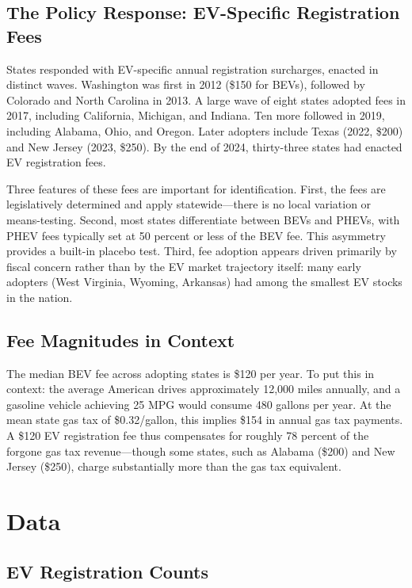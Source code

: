 \documentclass[12pt]{article}
\begin{document}
\subsection{The Policy Response: EV-Specific Registration Fees}

States responded with EV-specific annual registration surcharges, enacted in distinct waves. Washington was first in 2012 (\$150 for BEVs), followed by Colorado and North Carolina in 2013. A large wave of eight states adopted fees in 2017, including California, Michigan, and Indiana. Ten more followed in 2019, including Alabama, Ohio, and Oregon. Later adopters include Texas (2022, \$200) and New Jersey (2023, \$250). By the end of 2024, thirty-three states had enacted EV registration fees.

Three features of these fees are important for identification. First, the fees are legislatively determined and apply statewide---there is no local variation or means-testing. Second, most states differentiate between BEVs and PHEVs, with PHEV fees typically set at 50 percent or less of the BEV fee. This asymmetry provides a built-in placebo test. Third, fee adoption appears driven primarily by fiscal concern rather than by the EV market trajectory itself: many early adopters (West Virginia, Wyoming, Arkansas) had among the smallest EV stocks in the nation.

\subsection{Fee Magnitudes in Context}

The median BEV fee across adopting states is \$120 per year. To put this in context: the average American drives approximately 12,000 miles annually, and a gasoline vehicle achieving 25 MPG would consume 480 gallons per year. At the mean state gas tax of \$0.32/gallon, this implies \$154 in annual gas tax payments. A \$120 EV registration fee thus compensates for roughly 78 percent of the forgone gas tax revenue---though some states, such as Alabama (\$200) and New Jersey (\$250), charge substantially more than the gas tax equivalent.

\section{Data}
\label{sec:data}

\subsection{EV Registration Counts}
\end{document}
